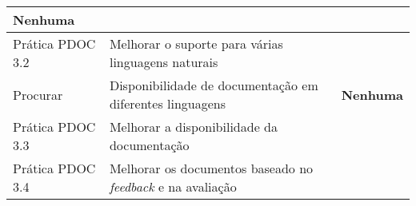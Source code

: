 \begin{longtable}{|p{2cm}|p{7cm}|p{7cm}|}
  \textbf{Nenhuma} \\
  \hline \cellcolor[gray]{0.9} Prática PDOC 3.2 &
  \cellcolor[gray]{0.9}
  Melhorar o suporte para várias linguagens naturais & \\
  \hline \multirow{1}{*}{Procurar} & Disponibilidade de documentação
  em diferentes linguagens &
  \textbf{Nenhuma} \\
  \hline \cellcolor[gray]{0.9} Prática PDOC 3.3 &
  \cellcolor[gray]{0.9}
  Melhorar a disponibilidade da documentação & \\
  \hline \cellcolor[gray]{0.9} Prática PDOC 3.4 &
  \cellcolor[gray]{0.9} Melhorar os documentos baseado no
  \textit{feedback} e na avaliação
  &   \label{tab:xp-to-omm} \\
  \hline
\end{longtable}

